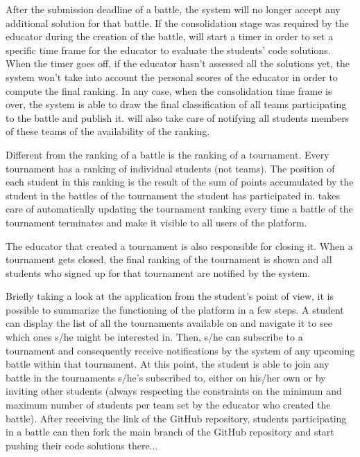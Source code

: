 	After the submission deadline of a battle, the system will no longer accept any additional solution for that battle. If the consolidation stage was required by the educator during the creation of the battle, \app will start a timer in order to set a specific time frame for the educator to evaluate the students' code solutions. When the timer goes off, if the educator hasn't assessed all the solutions yet, the system won't take into account the personal scores of the educator in order to compute the final ranking. In any case, when the consolidation time frame is over, the system is able to draw the final classification of all teams participating to the battle and publish it. \app will also take care of notifying all students members of these teams of the availability of the ranking.
	
	Different from the ranking of a battle is the ranking of a tournament. Every tournament has a ranking of individual students (not teams). The position of each student in this ranking is the result of the sum of points accumulated by the student in the battles of the tournament the student has participated in.
	\app takes care of automatically updating the tournament ranking every time a battle of the tournament terminates and make it visible to all users of the platform.
	
	The educator that created a tournament is also responsible for closing it. When a tournament gets closed, the final ranking of the tournament is shown and all students who signed up for that tournament are notified by the system.
	
	Briefly taking a look at the application from the student's point of view, it is possible to summarize the functioning of the platform in a  few steps. A student can display the list of all the tournaments available on \app and navigate it to see which ones s/he might be interested in. Then, s/he can subscribe to a tournament and consequently receive notifications by the system of any upcoming battle within that tournament. 
	At this point, the student is able to join any battle in the tournaments s/he's subscribed to, either on his/her own or by inviting other students (always respecting the constraints on the minimum and maximum number of students per team set by the educator who created the battle). After receiving the link of the GitHub repository, students participating in a battle can then fork the main branch of the GitHub repository and start pushing their code solutions there...
	
